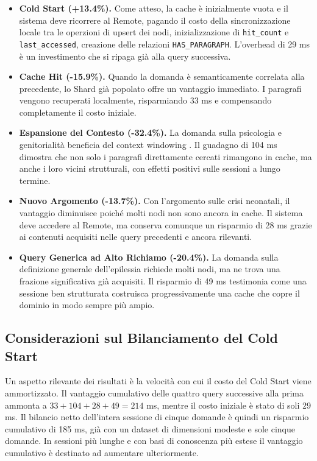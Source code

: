 \begin{itemize}
    \item \textbf{Cold Start (+13.4\%).} Come atteso, la cache è inizialmente vuota e il sistema deve ricorrere al Remote, pagando il costo della sincronizzazione locale tra le operzioni di upsert dei nodi, inizializzazione di \texttt{hit\_count} e \texttt{last\_accessed}, creazione delle relazioni \texttt{HAS\_PARAGRAPH}. L'overhead di 29 ms è un investimento che si ripaga già alla query successiva.

    \item \textbf{Cache Hit (-15.9\%).} Quando la domanda è semanticamente correlata alla precedente, lo Shard già popolato offre un vantaggio immediato. I paragrafi vengono recuperati localmente, risparmiando 33 ms e compensando completamente il costo iniziale.

    \item \textbf{Espansione del Contesto (-32.4\%).} La domanda sulla psicologia e genitorialità beneficia del context windowing . Il guadagno di 104 ms dimostra che non solo i paragrafi direttamente cercati rimangono in cache, ma anche i loro vicini strutturali, con effetti positivi sulle sessioni a lungo termine.

          \newpage

    \item \textbf{Nuovo Argomento (-13.7\%).} Con l'argomento sulle crisi neonatali, il vantaggio diminuisce poiché molti nodi non sono ancora in cache. Il sistema deve accedere al Remote, ma conserva comunque un risparmio di 28 ms grazie ai contenuti acquisiti nelle query precedenti e ancora rilevanti.

    \item \textbf{Query Generica ad Alto Richiamo (-20.4\%).} La domanda sulla definizione generale dell'epilessia richiede molti nodi, ma ne trova una frazione significativa già acquisiti. Il risparmio di 49 ms testimonia come una sessione ben strutturata costruisca progressivamente una cache che copre il dominio in modo sempre più ampio.
\end{itemize}

\subsection{Considerazioni sul Bilanciamento del Cold Start}

Un aspetto rilevante dei risultati è la velocità con cui il costo del Cold Start viene ammortizzato. Il vantaggio cumulativo delle quattro query successive alla prima ammonta a $33 + 104 + 28 + 49 = 214$ ms, mentre il costo iniziale è stato di soli 29 ms. Il bilancio netto dell'intera sessione di cinque domande è quindi un risparmio cumulativo di 185 ms, già con un dataset di dimensioni modeste e sole cinque domande. In sessioni più lunghe e con basi di conoscenza più estese il vantaggio cumulativo è destinato ad aumentare ulteriormente.

